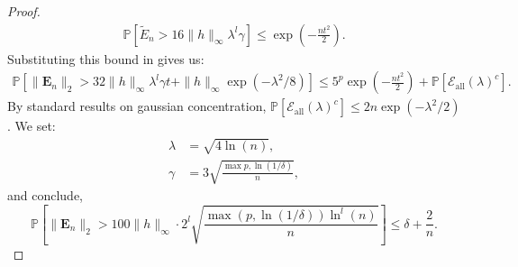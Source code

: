 \documentclass[final,12pt]{colt2018} %
\newcommand{\Prob}{\mathbb{P}}
\renewcommand\v[1]{{\ensuremath{\boldsymbol{#1}}}}
\begin{document}
\begin{proof}
\begin{align*}
    \Prob \left[  \tilde{E}_n > 16 \|h\|_\infty \lambda^l \gamma \right] \leq \exp \left( -\frac{n t^2}{2} \right).
\end{align*}
Substituting this bound in  gives us:
\begin{align*}
    \Prob \left[ \| \v E_n \|_2 > 32 \|h\|_\infty \lambda^l \gamma t + \|h\|_\infty \exp(-\lambda^2/8) \right] \leq 5^p \exp \left( -\frac{n t^2}{2} \right) + \Prob[\mathcal{E}_\text{all}(\lambda)^c].
\end{align*}
By standard results on gaussian concentration, $\Prob[\mathcal{E}_\text{all}(\lambda)^c] \leq 2n \exp(-\lambda^2/2)$.
We set:
\begin{align*}
    \lambda &= \sqrt{ 4 \ln(n)}, \\
    \gamma & = 3 \sqrt{\frac{\max{p,\ln(1/\delta)}}{n}},
\end{align*}
and conclude,
$$\Prob \left[ \| \v E_n \|_2 > 100 \|h\|_\infty \cdot 2^l \sqrt{\frac{\max(p,\ln(1/\delta)) \ln^l(n)}{n}}  \right] \leq \delta + \frac{2}{n}.$$
\end{proof}
\end{document}

